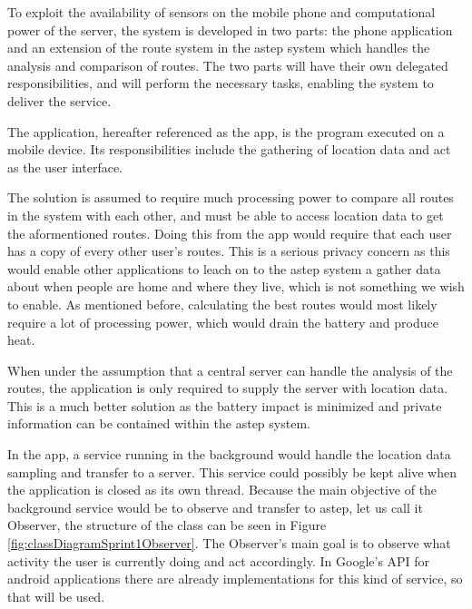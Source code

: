 To exploit the availability of sensors on the mobile phone and computational power of the server, the system is developed in two parts: the phone application and an extension of the route system in the \gls{astep} system which handles the analysis and comparison of routes.
The two parts will have their own delegated responsibilities, and will perform the necessary tasks, enabling the system to deliver the service.

The application, hereafter referenced as the app, is the program executed on a mobile device.
Its responsibilities include the gathering of location data and act as the user interface. 

The solution is assumed to require much processing power to compare all routes in the system with each other, and must be able to access location data to get the aformentioned routes.
Doing this from the app would require that each user has a copy of every other user's routes.
This is a serious privacy concern as this would enable other applications to leach on to the \gls{astep} system a gather data about when people are home and where they live, which is not something we wish to enable.
As mentioned before, calculating the best routes would most likely require a lot of processing power, which would drain the battery and produce heat.

When under the assumption that a central server can handle the analysis of the routes, the application is only required to supply the server with location data.
This is a much better solution as the battery impact is minimized and private information can be contained within the \gls{astep} system.

%	

In the app, a service running in the background would handle the location data sampling and transfer to a server.
This service could possibly be kept alive when the application is closed as its own thread.
Because the main objective of the background service would be to observe and transfer to \gls{astep}, let us call it Observer, the structure of the class can be seen in Figure \ref{fig:classDiagramSprint1Observer}.
The Observer's main goal is to observe what activity the user is currently doing and act accordingly.
In Google's API for android applications there are already implementations for this kind of service, so that will be used.

